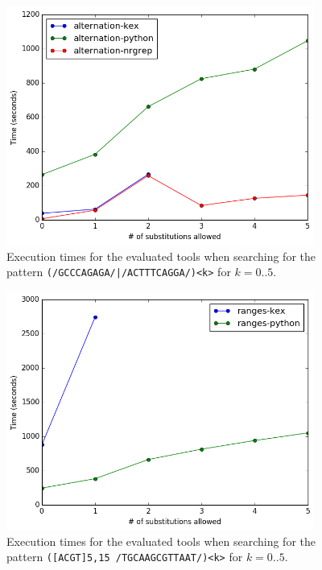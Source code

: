 \begin{figure}[!ht]
  \centering
  \includegraphics[width=0.9\textwidth]{images/alternation.png}
  \caption{Execution times for the evaluated tools when searching for the
    pattern \texttt{(/GCCCAGAGA/|/ACTTTCAGGA/)<k>} for $k=0..5$.}
  \label{fig:alternation}
\end{figure}

\begin{figure}[!ht]
  \centering
  \includegraphics[width=0.9\textwidth]{images/ranges.png}
  \caption{Execution times for the evaluated tools when searching for the
    pattern \texttt{([ACGT]{5,15} /TGCAAGCGTTAAT/)<k>} for $k=0..5$.}
  \label{fig:ranges}
\end{figure}



